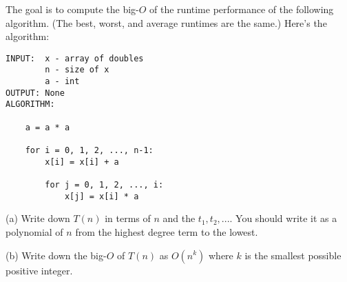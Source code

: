 The goal is to compute the big-$O$ of the runtime performance
of the following algorithm. 
(The best, worst, and average runtimes are the same.)
Here's the algorithm:
\begin{Verbatim}[frame=single]
INPUT:  x - array of doubles
        n - size of x
        a - int
OUTPUT: None
ALGORITHM:

    a = a * a                              

    for i = 0, 1, 2, ..., n-1:
        x[i] = x[i] + a                    

        for j = 0, 1, 2, ..., i:
            x[j] = x[i] * a                

\end{Verbatim}

(a) Write down $T(n)$ in terms of $n$ and the $t_1, t_2, ...$.
You should write it as a polynomial of $n$ from the highest
degree term to the lowest.

(b) Write down the big-$O$ of $T(n)$ as $O(n^k)$
where $k$ is the smallest possible  positive integer.

